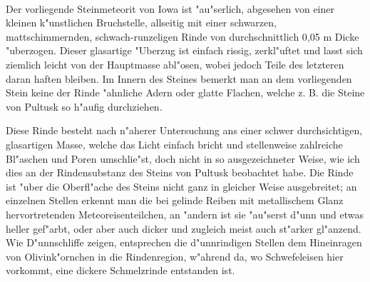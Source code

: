 \documentclass[a4paper, 11pt, oneside]{article}
\begin{document}
\paragraph{}
Der vorliegende Steinmeteorit von Iowa ist "au"serlich, abgesehen von einer kleinen k"unstlichen Bruchstelle, allseitig mit einer schwarzen, mattschimmernden, schwach-runzeligen Rinde von durchschnittlich 0,05 m Dicke "uberzogen. Dieser glasartige "Uberzug ist einfach rissig, zerkl"uftet und lasst sich ziemlich leicht von der Hauptmasse abl"osen, wobei jedoch Teile des letzteren daran haften bleiben. Im Innern des Steines bemerkt man an dem vorliegenden Stein keine der Rinde "ahnliche Adern oder glatte Flachen, welche z. B. die Steine von Pultusk so h"aufig durchziehen.

Diese Rinde besteht nach n"aherer Untersuchung ans einer schwer durchsichtigen, glasartigen Masse, welche das Licht einfach bricht und stellenweise zahlreiche Bl"aschen und Poren umschlie"st, doch nicht in so ausgezeichneter Weise, wie ich dies an der Rindensubstanz des Steins von Pultusk beobachtet habe. Die Rinde ist "uber die Oberfl"ache des Steins nicht ganz in gleicher Weise ausgebreitet; an einzelnen Stellen erkennt man die bei gelinde Reiben mit metallischem Glanz hervortretenden Meteoreisenteilchen, an "andern ist sie "au"serst d"unn und etwas heller gef"arbt, oder aber auch dicker und zugleich meist auch st"arker gl"anzend. Wie D"unnschliffe zeigen, entsprechen die d"unnrindigen Stellen dem Hineinragen von Olivink"ornchen in die Rindenregion, w"ahrend da, wo Schwefeleisen hier vorkommt, eine dickere Schmelzrinde entstanden ist.
\end{document}
